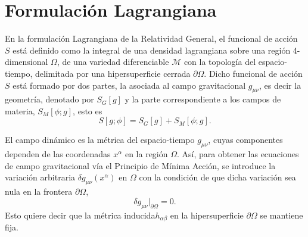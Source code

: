 
\section{Formulaci\'{o}n Lagrangiana}
\label{sec:FL}

En la formulaci\'{o}n Lagrangiana de la Relatividad General, el funcional de acci\'{o}n $S$ est\'{a} definido como la integral de una densidad lagrangiana sobre una regi\'{o}n 4-dimensional $\Omega$, de una variedad diferenciable $\mathcal{M}$ con la topolog\'{i}a del espacio-tiempo, delimitada por una hipersuperficie cerrada $\partial \Omega$.  Dicho funcional de acci\'{o}n $S$ est\'{a} formado por dos partes, la asociada al campo gravitacional $g_{\mu \nu}$, es decir la geometr\'{i}a, denotado por $S_{G}[g]$ y la parte correspondiente a los campos de materia, $S_{M}[\phi; g]$, esto es
%
\begin{equation}
\label{eq:S}
S[g; \phi] = S_{G}[g] + S_{M}[\phi; g].
\end{equation}

El campo din\'{a}mico es la m\'{e}trica del espacio-tiempo $g_{\mu \nu}$, cuyas componentes dependen de las coordenadas $x^{\alpha}$ en la regi\'{o}n $\Omega$. As\'{i}, para obtener las ecuaciones de campo gravitacional v\'{i}a el Principio de M\'{i}nima Acci\'{o}n, se introduce la variaci\'{o}n arbitraria $\delta g_{\mu \nu}(x^{\alpha})$ en $\Omega$ con la condici\'{o}n de que dicha variaci\'{o}n sea nula en la frontera $\partial \Omega$,
%
\begin{equation}
\label{eq:boundcond}
\delta g_{\mu \nu} \Big|_{\partial \Omega} = 0.
\end{equation}
Esto quiere decir que la m\'{e}trica inducida\footnotemark $h_{\alpha \beta}$ en la hipersuperficie $\partial \Omega$ se mantiene fija.

